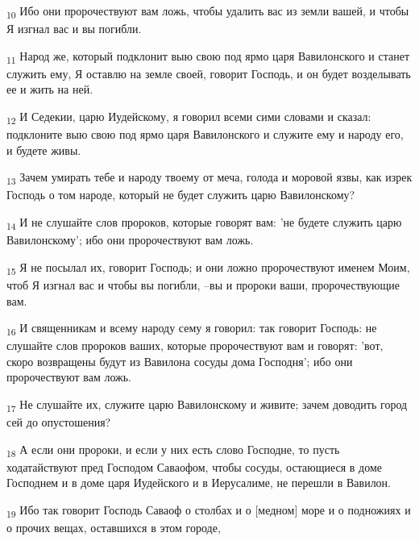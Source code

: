 \begin{tcolorbox}
\textsubscript{10} Ибо они пророчествуют вам ложь, чтобы удалить вас из земли вашей, и чтобы Я изгнал вас и вы погибли.
\end{tcolorbox}
\begin{tcolorbox}
\textsubscript{11} Народ же, который подклонит выю свою под ярмо царя Вавилонского и станет служить ему, Я оставлю на земле своей, говорит Господь, и он будет возделывать ее и жить на ней.
\end{tcolorbox}
\begin{tcolorbox}
\textsubscript{12} И Седекии, царю Иудейскому, я говорил всеми сими словами и сказал: подклоните выю свою под ярмо царя Вавилонского и служите ему и народу его, и будете живы.
\end{tcolorbox}
\begin{tcolorbox}
\textsubscript{13} Зачем умирать тебе и народу твоему от меча, голода и моровой язвы, как изрек Господь о том народе, который не будет служить царю Вавилонскому?
\end{tcolorbox}
\begin{tcolorbox}
\textsubscript{14} И не слушайте слов пророков, которые говорят вам: 'не будете служить царю Вавилонскому'; ибо они пророчествуют вам ложь.
\end{tcolorbox}
\begin{tcolorbox}
\textsubscript{15} Я не посылал их, говорит Господь; и они ложно пророчествуют именем Моим, чтоб Я изгнал вас и чтобы вы погибли, --вы и пророки ваши, пророчествующие вам.
\end{tcolorbox}
\begin{tcolorbox}
\textsubscript{16} И священникам и всему народу сему я говорил: так говорит Господь: не слушайте слов пророков ваших, которые пророчествуют вам и говорят: 'вот, скоро возвращены будут из Вавилона сосуды дома Господня'; ибо они пророчествуют вам ложь.
\end{tcolorbox}
\begin{tcolorbox}
\textsubscript{17} Не слушайте их, служите царю Вавилонскому и живите; зачем доводить город сей до опустошения?
\end{tcolorbox}
\begin{tcolorbox}
\textsubscript{18} А если они пророки, и если у них есть слово Господне, то пусть ходатайствуют пред Господом Саваофом, чтобы сосуды, остающиеся в доме Господнем и в доме царя Иудейского и в Иерусалиме, не перешли в Вавилон.
\end{tcolorbox}
\begin{tcolorbox}
\textsubscript{19} Ибо так говорит Господь Саваоф о столбах и о [медном] море и о подножиях и о прочих вещах, оставшихся в этом городе,
\end{tcolorbox}
